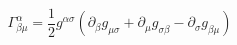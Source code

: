 \begin{equation}
\Gamma _{\beta \mu }^{\alpha }=\frac{1}{2}g^{\alpha \sigma }
(\partial_{\beta }g_{\mu \sigma }+\partial _{\mu }g_{\sigma \beta
}-\partial _{\sigma }g_{\beta \mu })
\end{equation}

